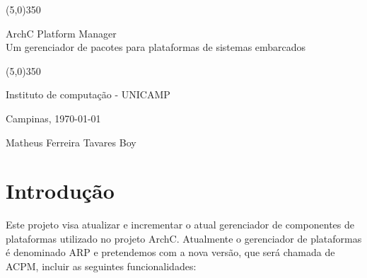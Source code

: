 \documentclass[10pt,a4paper]{article}
\begin{document}
    \begin{titlepage}
        \begin{center} \line(5,0){350} \end{center}
        \begin{center} \huge{ArchC Platform Manager \\ Um gerenciador de pacotes para plataformas de sistemas embarcados} \end{center}
        \begin{center} \line(5,0){350} \end{center}
        \vspace{5cm}
        \begin{center} \large{Instituto de computação - UNICAMP} \end{center}
        \begin{center} Campinas, \today \end{center}
        \vspace{3cm}
        \begin{center} \large{Matheus Ferreira Tavares Boy} \end{center}
        
    \end{titlepage}
    \tableofcontents
    \clearpage
    
        
\section{Introdução}

Este projeto visa atualizar e incrementar o atual gerenciador de
componentes de plataformas utilizado no projeto ArchC. Atualmente o
gerenciador de plataformas é denominado ARP e pretendemos com a nova
versão, que será chamada de ACPM, incluir as seguintes
funcionalidades:
\end{document}
